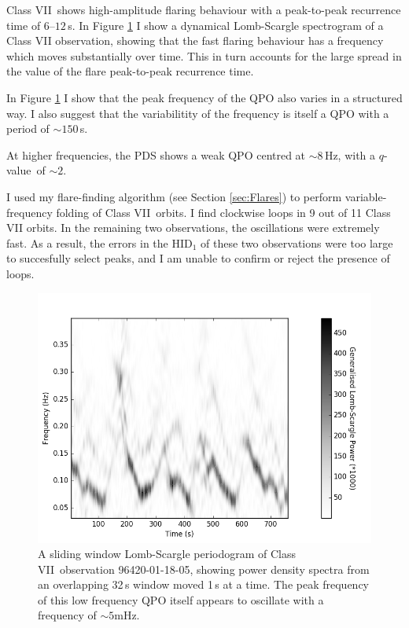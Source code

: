 \par Class VII\indexvii\ shows high-amplitude flaring behaviour with a peak-to-peak recurrence time of $6$--$12$\,s.  In Figure \ref{fig:spect} I show a dynamical Lomb-Scargle spectrogram of a Class VII observation, showing that the fast flaring behaviour has a frequency which moves substantially over time.  This in turn accounts for the large spread in the value of the flare peak-to-peak recurrence time.
\par In Figure \ref{fig:spect} I show that the peak frequency of the QPO also varies in a structured way.  I also suggest that the variabilitity of the frequency is itself a QPO with a period of $\sim150$\,s.
\par At higher frequencies, the PDS shows a weak QPO centred at $\sim8$\,Hz, with a $q$-value\indexq\ of $\sim2$.
\par I used my flare-finding algorithm (see Section \ref{sec:Flares}) to perform variable-frequency folding of Class VII\indexvii\ orbits.  I find clockwise loops in 9 out of 11 Class VII orbits.  In the remaining two observations, the oscillations were extremely fast.  As a result, the errors in the HID$_1$ of these two observations were too large to succesfully select peaks, and I am unable to confirm or reject the presence of loops.

\begin{figure}
    \includegraphics[width=0.8\columnwidth, trim = 0.6cm 0 3.9cm 0]{images/N_sgram.png}
    \captionsetup{singlelinecheck=off}
    \caption[A sliding window Lomb-Scargle spectrogram of Class VII observation 96420-01-18-05.]{A sliding window Lomb-Scargle periodogram of Class VII\indexvii\ observation 96420-01-18-05, showing power density spectra from an overlapping 32\,s window moved 1\,s at a time.  The peak frequency of this low frequency QPO itself appears to oscillate with a frequency of $\sim5$mHz.}
   \label{fig:spect}
\end{figure}

